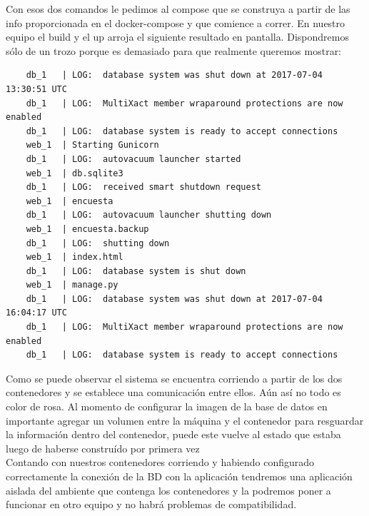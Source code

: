 \documentclass[14pt]{extarticle}
\begin{document}
    Con esos dos comandos le pedimos al compose que se construya a partir de las info proporcionada en el docker-compose y que comience a correr. En nuestro equipo el build y el up arroja el siguiente resultado en pantalla. Dispondremos sólo de un trozo porque es demasiado para que realmente queremos mostrar: \\
    \begin{lstlisting}
    db_1   | LOG:  database system was shut down at 2017-07-04 13:30:51 UTC
    db_1   | LOG:  MultiXact member wraparound protections are now enabled
    db_1   | LOG:  database system is ready to accept connections
    web_1  | Starting Gunicorn
    db_1   | LOG:  autovacuum launcher started
    web_1  | db.sqlite3
    db_1   | LOG:  received smart shutdown request
    web_1  | encuesta
    db_1   | LOG:  autovacuum launcher shutting down
    web_1  | encuesta.backup
    db_1   | LOG:  shutting down
    web_1  | index.html
    db_1   | LOG:  database system is shut down
    web_1  | manage.py
    db_1   | LOG:  database system was shut down at 2017-07-04 16:04:17 UTC
    db_1   | LOG:  MultiXact member wraparound protections are now enabled
    db_1   | LOG:  database system is ready to accept connections
    \end{lstlisting}

    
    Como se puede observar el sistema se encuentra corriendo a partir de los dos contenedores y se establece una comunicación entre ellos. Aún así no todo es color de rosa. Al momento de configurar la imagen de la base de datos en importante agregar un volumen entre la máquina y el contenedor para resguardar la información dentro del contenedor, puede este vuelve al estado que estaba luego de haberse construído por primera vez
\\
    Contando con nuestros contenedores corriendo y habiendo configurado correctamente la conexión de la BD con la aplicación tendremos una aplicación aislada del ambiente que contenga los contenedores y la podremos poner a funcionar en otro equipo y no habrá problemas de compatibilidad.
    \clearpage
    
    
\end{document}
